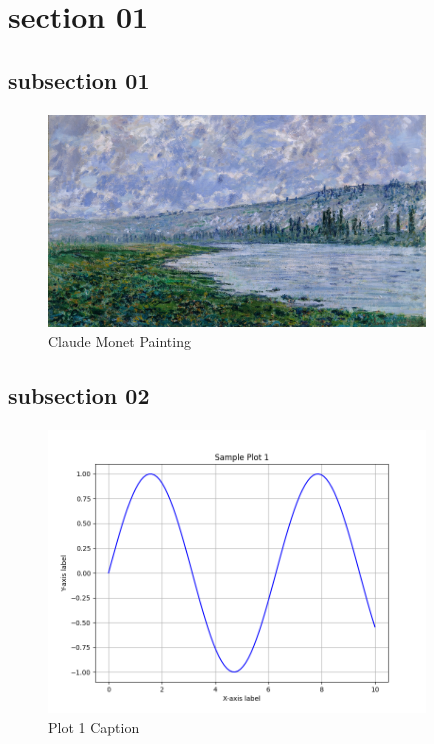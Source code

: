 \documentclass[class=book, crop=false]{standalone}
\begin{document}
\section{section 01}

\subsection{subsection 01}

\paragraph*{}
\blindtext

\paragraph*{}
\blindtext

\begin{figure}[htbp]
    \centering
    \includegraphics[width=10cm]{../../figures_and_plots/figures/claude_monet_painting.jpg}
    \caption{Claude Monet Painting}
    \label{fig:claude_monet_painting}
\end{figure}

\subsection{subsection 02}

\paragraph*{}
\Blindtext

\begin{figure}[htbp]
    \centering
    \includegraphics[width=10cm]{../../figures_and_plots/plots/plot1.png}
    \caption{Plot 1 Caption}
    \label{fig:plot1}
\end{figure}
\end{document}
